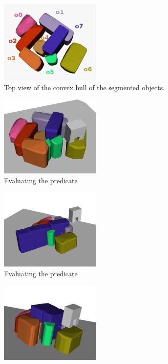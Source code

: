 \begin{figure}[tb]
\centering
\begin{subfigure}[t]{5cm}
\centering
\includegraphics[width=5cm]{Img/block_dir/original_labels2.png}
\caption{Top view of the convex hull of the segmented objects.}\label{fig:block_dir_original}
\end{subfigure}
\begin{subfigure}[t]{5cm}
\centering
\includegraphics[width=5cm]{Img/block_dir/pushing11.png}
\caption{Evaluating the  predicate}\label{fig:block_dir_push1}
\end{subfigure}
\begin{subfigure}[t]{5cm}
\centering
\includegraphics[width=5cm]{Img/block_dir/pushing22.png}
\caption{Evaluating the  predicate}\label{fig:block_dir_original}
\end{subfigure}
\begin{subfigure}[t]{5cm}
\centering
\includegraphics[width=5cm]{Img/block_dir/pushing33.png}

\end{subfigure}
\end{figure}
